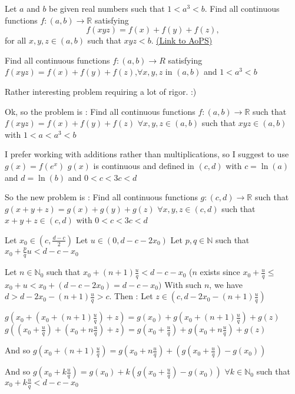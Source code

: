 \begin{problem}
	Let $a$ and $b$ be given real numbers such that $1<a^3<b$. Find all continuous functions $ f: (a,b)\to \mathbb R$ satisfying \[ f(xyz)=f(x)+f(y)+f(z),\] for all $x,y,z \in  (a,b)$ such that $xyz < b$.
	\flushright \href{https://artofproblemsolving.com/community/c6h277426}{(Link to AoPS)}
\end{problem}



\begin{solution}
	\begin{tcolorbox}Find all continuous functions $ f: (a,b)\to R$ satisfying $ f(xyz) = f(x) + f(y) + f(z)$,$ \forall x,y,z$ in $ (a,b)$
and $ 1 < a^3 < b$\end{tcolorbox}

Rather interesting problem requiring a lot of rigor. :)

Ok, so the problem is :
Find all continuous functions $ f : (a,b)\to\mathbb R$ such that $ f(xyz)=f(x)+f(y)+f(z)$ $ \forall x,y,z\in(a,b)$ such that $ xyz\in(a,b)$ with $ 1<a<a^3<b$

I prefer working with additions rather than multiplications, so I suggest to use $ g(x)=f(e^x)$
$ g(x)$ is continuous and defined in $ (c,d)$ with $ c=\ln(a)$ and $ d=\ln(b)$ and $ 0<c<3c<d$

So the new problem is :
Find all continuous functions $ g : (c,d)\to\mathbb R$ such that $ g(x+y+z)=g(x)+g(y)+g(z)$ $ \forall x,y,z\in(c,d)$ such that $ x+y+z\in(c,d)$ with $ 0<c<3c<d$

Let $ x_0\in(c,\frac{d-c}{2})$
Let $ u\in(0,d-c-2x_0)$
Let $ p,q\in\mathbb N$ such that $ x_0+\frac{p}{q}u<d-c-x_0$

Let $ n\in\mathbb N_0$ such that $ x_0+(n+1)\frac{u}{q} < d-c-x_0$ ($ n$ exists since $ x_0+\frac{u}{q}\leq$ $ x_0+u<x_0+(d-c-2x_0)=d-c-x_0)$
With such $ n$, we have $ d>d-2x_0-(n+1)\frac{u}{q} > c$. Then : Let $ z\in(c,d-2x_0-(n+1)\frac{u}{q})$

$ g(x_0+(x_0+(n+1)\frac{u}{q})+z)=g(x_0)+g(x_0+(n+1)\frac{u}{q})+g(z)$
$ g((x_0+\frac{u}{q})+(x_0+n\frac{u}{q})+z)=g(x_0+\frac{u}{q})+g(x_0+n\frac{u}{q})+g(z)$

And so $ g(x_0+(n+1)\frac{u}{q})=g(x_0+n\frac{u}{q})+(g(x_0+\frac{u}{q})-g(x_0))$

And so $ g(x_0+k\frac{u}{q})=g(x_0)+k(g(x_0+\frac{u}{q})-g(x_0))$ $ \forall k\in\mathbb N_0$ such that $ x_0+k\frac{u}{q} < d-c-x_0$


\end{solution}
